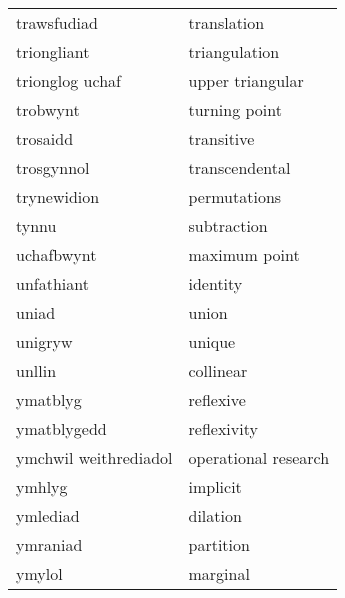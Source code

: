 \begin{supertabular}{p{0.22\textwidth}p{0.22\textwidth}}
                    trawsfudiad &                      translation \\
                    triongliant &                    triangulation \\
                trionglog uchaf &                 upper triangular \\
                       trobwynt &                    turning point \\
                       trosaidd &                       transitive \\
                     trosgynnol &                   transcendental \\
                    trynewidion &                     permutations \\
                          tynnu &                      subtraction \\
                     uchafbwynt &                    maximum point \\
                     unfathiant &                         identity \\
                          uniad &                            union \\
                        unigryw &                           unique \\
                         unllin &                        collinear \\
                       ymatblyg &                        reflexive \\
                    ymatblygedd &                      reflexivity \\
          ymchwil weithrediadol &             operational research \\
                         ymhlyg &                         implicit \\
                       ymlediad &                         dilation \\
                       ymraniad &                        partition \\
                         ymylol &                         marginal \\
\end{supertabular}
